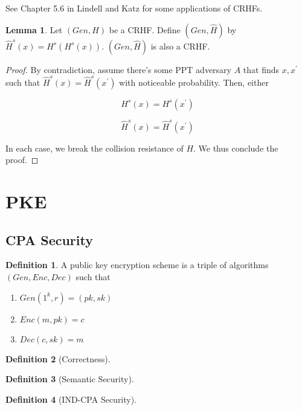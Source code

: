 \documentclass{article}
\theoremstyle{definition}
\newtheorem{definition}{Definition}
\newtheorem{lemma}[theorem]{Lemma}
\begin{document}
See Chapter 5.6 in Lindell and Katz for some applications of CRHFs.

\begin{lemma}
    Let $(Gen, H)$ be a CRHF. Define $(Gen, \hat{H})$ by $\hat{H}^{s}(x) = H^{s}(H^{s}(x))$.
    $(Gen, \hat{H})$ is also a CRHF.
\end{lemma}
\begin{proof}
    By contradiction, assume there's some PPT adversary $A$ that finds $x,x^{\prime}$ such that
    $\hat{H}^{s}(x) = \hat{H}^{s}(x^{\prime})$ with noticeable probability. Then, either

    \[ H^{s}(x) = H^{s}(x^{\prime})\]

    \[ \hat{H}^{s}(x) = \hat{H}^{s}(x^{\prime})\]

    In each case, we break the collision resistance of $H$. We thus conclude the proof.

\end{proof}

\newpage

\section{PKE}

\subsection{CPA Security}

\begin{definition}
    A public key encryption scheme is a triple of algorithms $(Gen, Enc, Dec)$
    such that 

    \begin{enumerate}
        \item $Gen(1^{k}, r) = (pk, sk)$
        \item $Enc(m, pk) = c$
        \item $Dec(c, sk) = m$
    \end{enumerate}
\end{definition}

\begin{definition}[Correctness]
    
\end{definition}

\begin{definition}[Semantic Security]
    
\end{definition}

\begin{definition}[IND-CPA Security]
    
\end{definition}
\end{document}
